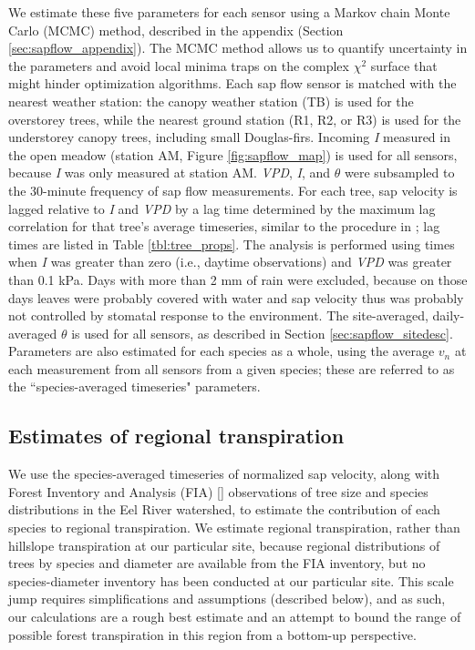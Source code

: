 We estimate these five parameters for each sensor using a Markov chain Monte Carlo (MCMC) method, described in the appendix (Section \ref{sec:sapflow_appendix}).  The MCMC method allows us to quantify uncertainty in the parameters and avoid local minima traps on the complex $\chi ^2$ surface that might hinder optimization algorithms.  Each sap flow sensor is matched with the nearest weather station: the canopy weather station (TB) is used for the overstorey trees, while the nearest ground station (R1, R2, or R3) is used for the understorey canopy trees, including small Douglas-firs.  Incoming \textit{I} measured in the open meadow (station AM, Figure \ref{fig:sapflow_map}) is used for all sensors, because \textit{I} was only measured at station AM.  \textit{VPD}, \textit{I}, and $\theta$ were subsampled to the 30-minute frequency of sap flow measurements.  For each tree, sap velocity is lagged relative to \textit{I} and \textit{VPD} by a lag time determined by the maximum lag correlation for that tree's average timeseries, similar to the procedure in \cite{dragoni2009decoupling}; lag times are listed in Table \ref{tbl:tree_props}.  The analysis is performed using times when \textit{I} was greater than zero (i.e., daytime observations) and \textit{VPD} was greater than 0.1 kPa.  Days with more than 2 mm of rain were excluded, because on those days leaves were probably covered with water and sap velocity thus was probably not controlled by stomatal response to the environment.  The site-averaged, daily-averaged $\theta$ is used for all sensors, as described in Section \ref{sec:sapflow_sitedesc}.  Parameters are also estimated for each species as a whole, using the average $v_n$ at each measurement from all sensors from a given species; these are referred to as the ``species-averaged timeseries" parameters.

\subsection{Estimates of regional transpiration}
\label{sec:sapflow_regmeth}
We use the species-averaged timeseries of normalized sap velocity, along with Forest Inventory and Analysis (FIA) [\cite{woudenberg2010forest}] observations of tree size and species distributions in the Eel River watershed, to estimate the contribution of each species to regional transpiration.  We estimate regional transpiration, rather than hillslope transpiration at our particular site, because regional distributions of trees by species and diameter are available from the FIA inventory, but no species-diameter inventory has been conducted at our particular site.  This scale jump requires simplifications and assumptions (described below), and as such, our calculations are a rough best estimate and an attempt to bound the range of possible forest transpiration in this region from a bottom-up perspective.  

